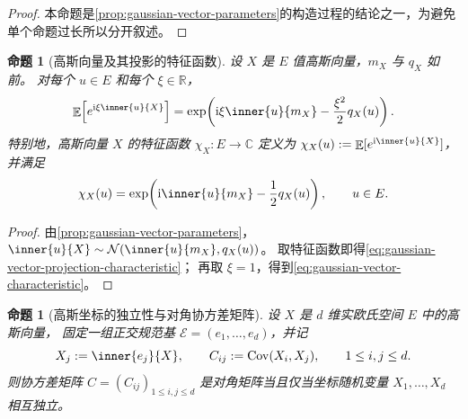 \documentclass[UTF8,11pt,a4paper,oneside,fontset=fandol]{ctexrep}
\numberwithin{equation}{section}
\theoremstyle{plain}
\newtheorem{proposition}[theorem]{命题}
\theoremstyle{definition}
\theoremstyle{remark}
\newcommand{\R}{\mathbb{R}}
\newcommand{\C}{\mathbb{C}}
\DeclareMathOperator{\E}{\mathbb{E}}
\DeclareMathOperator{\Cov}{Cov}
\begin{document}
\begin{proof}
本命题是\cref{prop:gaussian-vector-parameters}的构造过程的结论之一，为避免单个命题过长所以分开叙述。
\end{proof}

\begin{proposition}[高斯向量及其投影的特征函数]
\label{prop:gaussian-vector-characteristic}
设 $X$ 是 $E$ 值高斯向量，$m_X$ 与 $q_X$ 如前。
对每个 $u\in E$ 和每个 $\xi\in\R$，
\begin{equation}
  \label{eq:gaussian-vector-projection-characteristic}
  \E\!\left[e^{\mathrm{i}\xi\inner{u}{X}}\right]
  =\exp\!\left(
     \mathrm{i}\xi\inner{u}{m_X}-\frac{\xi^2}{2}q_X(u)
   \right).
\end{equation}
特别地，高斯向量 $X$ 的特征函数
$\chi_X:E\to\C$ 定义为
$\chi_X(u):=\E[e^{\mathrm{i}\inner{u}{X}}]$，并满足
\begin{equation}
  \label{eq:gaussian-vector-characteristic}
  \chi_X(u)
  =\exp\!\left(\mathrm{i}\inner{u}{m_X}-\frac12q_X(u)\right),
  \qquad u\in E.
\end{equation}
\end{proposition}

\begin{proof}
由\cref{prop:gaussian-vector-parameters}，
$\inner{u}{X}\sim\mathcal{N}(\inner{u}{m_X},q_X(u))$。
取特征函数即得\cref{eq:gaussian-vector-projection-characteristic}；
再取 $\xi=1$，得到\cref{eq:gaussian-vector-characteristic}。
\end{proof}

\begin{proposition}[高斯坐标的独立性与对角协方差矩阵]
\label{prop:gaussian-diagonal-independence}
设 $X$ 是 $d$ 维实欧氏空间 $E$ 中的高斯向量，
固定一组正交规范基 $\mathcal{E}=(e_1,\ldots,e_d)$，并记
\[
  X_j:=\inner{e_j}{X},\qquad
  C_{ij}:=\Cov(X_i,X_j),\qquad 1\le i,j\le d.
\]
则协方差矩阵 $C=(C_{ij})_{1\le i,j\le d}$ 是对角矩阵当且仅当坐标随机变量 $X_1,\ldots,X_d$ 相互独立。
\end{proposition}
\end{document}
